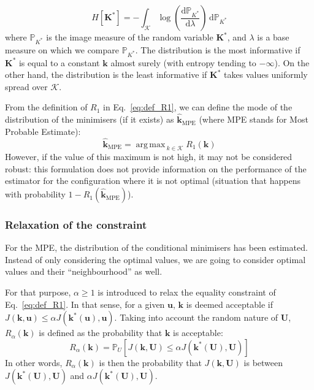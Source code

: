 \documentclass[npg, manuscript]{copernicus}
\DeclareMathOperator*{\argmax}{arg\,max \,}
\newcommand{\Prob}{\mathbb{P}}
\begin{document}
\begin{equation}
  \label{eq:entropy_def}
  H\left[\mathbf{K}^*\right] 
  = -\int_{\mathcal{K}}  \log\left(\frac{\mathrm{d}\Prob_{K^*}}{\mathrm{d}\lambda} \right) \,\mathrm{d}\Prob_{K^*}
\end{equation}
where $\Prob_{K^*}$ is the image measure of the random variable $\mathbf{K}^*$, and $\lambda$ is a base measure on which we compare $\Prob_{K^*}$.
 The distribution is the most informative if $\mathbf{K}^*$ is equal to a constant $\mathbf{k}$ almost surely (with entropy tending to $-\infty$). On the other hand, the distribution is the least informative if $\mathbf{K}^*$ takes values uniformly spread over $\mathcal{K}$.


From the definition of $R_1$ in Eq.~\eqref{eq:def_R1}, we can define the mode of the distribution of the minimisers (if it exists) as $\hat{\mathbf{k}}_{\mathrm{MPE}}$ (where MPE stands for Most Probable Estimate):
\begin{equation}
  \label{eq:MPE}
  \hat{\mathbf{k}}_{\mathrm{MPE}} = \argmax_{k\in\mathcal{K}} R_1(\mathbf{k}) 
\end{equation}
However, if the value of this maximum is not high, it may not be considered robust: this formulation does not provide information on the performance of the estimator for the configuration where it is not optimal (situation that happens with probability $1-R_1(\hat{\mathbf{k}}_{\mathrm{MPE}})$).

\subsubsection{Relaxation of the constraint}
\label{ssec:relax_constraint}

For the MPE, the distribution of the conditional minimisers has been estimated. Instead of only considering the optimal values, we are going to consider optimal values and their ``neighbourhood'' as well.

For that purpose, $\alpha \geq 1$ is introduced to relax the equality constraint of Eq.~\eqref{eq:def_R1}.
In that sense, for a given $\mathbf{u}$, $\mathbf{k}$ is deemed acceptable if $J(\mathbf{k},\mathbf{u}) \leq \alpha J(\mathbf{k}^*(\mathbf{u}), \mathbf{u})$. Taking into account the random nature of $\mathbf{U}$,  $R_\alpha(\mathbf{k})$ is defined as the probability that $\mathbf{k}$ is acceptable:
\begin{equation}
  \label{eq:def_Ralpha}
  R_\alpha(\mathbf{k}) = \Prob_U\left[J(\mathbf{k},\mathbf{U}) \leq 
    \alpha J(\mathbf{k}^*(\mathbf{U}),\mathbf{U}) \right]
\end{equation}
In other words, $R_{\alpha}(\mathbf{k})$ is then the probability that $J(\mathbf{k},\mathbf{U})$ is between 
$J(\mathbf{k}^*(\mathbf{U}),\mathbf{U})$ and 
$\alpha J(\mathbf{k}^*(\mathbf{U}),\mathbf{U})$.
\end{document}

